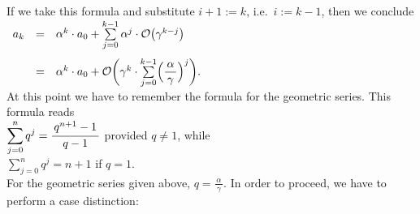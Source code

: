 If we take this formula and substitute $i + 1 := k$, i.e.~$i := k - 1$, then we conclude
\\[0.2cm]
\hspace*{1.3cm}
$\displaystyle 
\begin{array}[b]{lcl}
a_k & = & \alpha^{k} \cdot a_{0} + \sum\limits_{j=0}^{k-1} \alpha^{j} \cdot \mathcal{O}\bigl(\gamma^{k-j}\bigr) \\[0.5cm]
    & = & \alpha^{k} \cdot a_{0} + \mathcal{O}\biggl(\gamma^k \cdot \sum\limits_{j=0}^{k-1} \Bigl(\displaystyle\frac{\,\alpha\,}{\gamma}\Bigr)^j\biggr).  \\[0.2cm]
\end{array}
$
\\[0.2cm]
At this point we have to remember the formula for the geometric series.  This formula reads
\\[0.2cm]
\hspace*{1.3cm}
$\displaystyle\sum\limits_{j=0}^n q^j = \bruch{q^{n+1} - 1}{q - 1}$ \quad provided $q \not= 1$, while
\\[0.2cm]
\hspace*{1.3cm}
$\displaystyle\sum\limits_{j=0}^n q^j = n+1$ \quad if $q = 1$.
\\[0.2cm]
For the geometric series given above, $q = \displaystyle\frac{\,\alpha\,}{\gamma}$.  
In order to proceed, we have to perform a case distinction:
